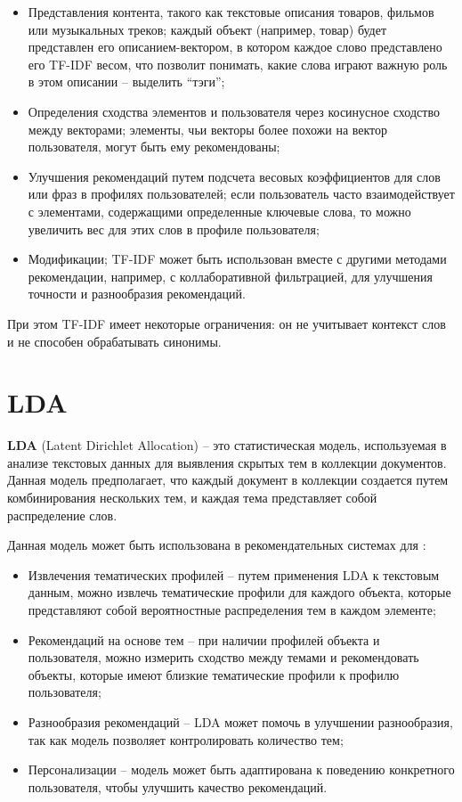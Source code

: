 \documentclass[12pt]{report}
\begin{document}
\begin{itemize}
	\item Представления контента, такого как текстовые описания товаров, фильмов или музыкальных треков; каждый объект (например, товар) будет представлен его описанием-вектором, в котором каждое слово представлено его TF-IDF весом, что позволит понимать, какие слова играют важную роль в этом описании -- выделить ``тэги'';
	\item Определения сходства элементов и пользователя через косинусное сходство между векторами; элементы, чьи векторы более похожи на вектор пользователя, могут быть ему рекомендованы;
	\item Улучшения рекомендаций путем подсчета весовых коэффициентов для слов или фраз в профилях пользователей; если пользователь часто взаимодействует с элементами, содержащими определенные ключевые слова, то можно увеличить вес для этих слов в профиле пользователя;
	\item Модификации; TF-IDF может быть использован вместе с другими методами рекомендации, например, с коллаборативной фильтрацией, для улучшения точности и разнообразия рекомендаций.
\end{itemize}

При этом TF-IDF имеет некоторые ограничения: он не учитывает контекст слов и не способен обрабатывать синонимы. \cite{tfidf}

\section{LDA}

\textbf{LDA} (Latent Dirichlet Allocation) -- это статистическая модель, используемая в анализе текстовых данных для выявления скрытых тем в коллекции документов. Данная модель предполагает, что каждый документ в коллекции создается путем комбинирования нескольких тем, и каждая тема представляет собой распределение слов. \cite{lda}

Данная модель может быть использована в рекомендательных системах для \cite{lda}:

\begin{itemize}
	\item Извлечения тематических профилей -- путем применения LDA к текстовым данным, можно извлечь тематические профили для каждого объекта, которые представляют собой вероятностные распределения тем в каждом элементе;
	\item Рекомендаций на основе тем -- при наличии профилей объекта и пользователя, можно измерить сходство между темами и рекомендовать объекты, которые имеют близкие тематические профили к профилю пользователя;
	\item Разнообразия рекомендаций -- LDA может помочь в улучшении разнообразия, так как модель позволяет контролировать количество тем;
	\item Персонализации -- модель может быть адаптирована к поведению конкретного пользователя, чтобы улучшить качество рекомендаций.
\end{itemize}
\end{document}
